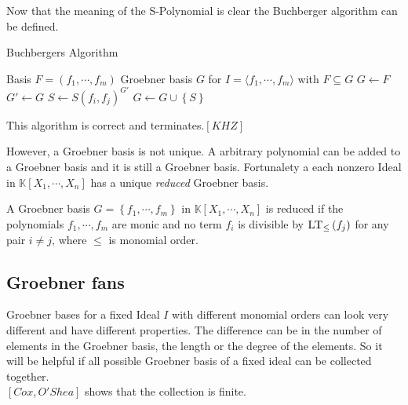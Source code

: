 Now that the meaning of the S-Polynomial is clear the Buchberger algorithm can be defined.

\begin{algorithm}
\caption{Buchbergers Algorithm}
\label{alg:buchberger}
\begin{algorithmic}[1]
\Require Basis $F = \left( f_{1}, \cdots, f_{m} \right)  $
\Ensure Groebner basis $G$ for $I = \langle f_{1}, \cdots, f_{m} \rangle $ with $ F \subseteq G $
\State $G \gets F$
\Repeat
\State $G'\gets G $
\State $S \gets S\left( f_{i},f_{j} \right)^{G'}  $ 
\State $G \gets G \cup \left\lbrace S\right\rbrace $
\EndIf
\EndFor
{}

\end{algorithmic}
\end{algorithm}

This algorithm is correct and terminates.$\left[ KHZ\right]  $

\newpage

However, a Groebner basis is not unique. A arbitrary polynomial can be added to a Groebner basis and it is still a Groebner basis.
Fortunalety a each nonzero Ideal in $\mathbb{K}\left[X_{1}, \cdots, X_{n}\right]$ has a unique \textit{reduced} Groebner basis.

\begin{env_definition}
A Groebner basis  $G= \left\lbrace  f_{1}, \cdots , f_{m} \right\rbrace  $ in 
$ \mathbb{K}\left[X_{1}, \cdots, X_{n}\right] $ is reduced if the polynomials $f_{1},\cdots , f_{m} $ are monic and no term $f_{i}$ is divisible by $ \textsc{LT}_{\leq }\left( f_{j}\right)$ for any pair $i\neq j$, where $\leq$ is monomial order.
\end{env_definition}


\subsection{Groebner fans}
\label{subsec:Groebnerfan}
 Groebner bases for a fixed Ideal $I$ with different monomial orders can look very different and have different properties. The difference can be in the number of elements in the Groebner basis, the length or the degree of the elements. So it will be helpful if all 
possible Groebner basis of a fixed ideal can be collected together.\\
$\left[ Cox,O'Shea\right]  $ shows that the collection is finite.
 
